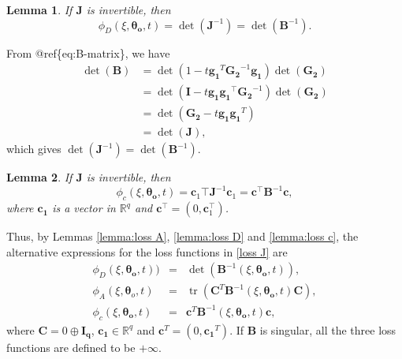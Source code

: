 \documentclass[
]{book}
\newtheorem{lemma}{Lemma}[chapter]
\theoremstyle{definition}
\theoremstyle{definition}
\theoremstyle{definition}
\theoremstyle{definition}
\theoremstyle{remark}
\begin{document}
\begin{lemma}
\protect\hypertarget{lem:loss-D}{}\label{lem:loss-D}If \(\boldsymbol{J}\) is invertible, then
\begin{equation*}
    \phi_D(\xi,\boldsymbol{\theta_o},t)=\det(\boldsymbol{J}^{-1})=\det(\boldsymbol{B}^{-1}).
\end{equation*}
\end{lemma}

From @ref\{eq:B-matrix\}, we have
\begin{align*}
    \det(\boldsymbol{B})    &= \det(1-t\boldsymbol{g_1}^T\boldsymbol{G_2}^{-1}\boldsymbol{g_1})\det(\boldsymbol{G_2})\\
            &= \det(\boldsymbol{I}-t\boldsymbol{g_1}\boldsymbol{g_1}^\top\boldsymbol{G_2}^{-1}) \det(\boldsymbol{G_2}) \\
            &=  \det(\boldsymbol{G_2}-t\boldsymbol{g_1}\boldsymbol{g_1}^T)\\
            &= \det(\boldsymbol{J}),
    \end{align*}
which gives \(\det(\boldsymbol{J}^{-1})=\det(\boldsymbol{B}^{-1})\).

\begin{lemma}
\protect\hypertarget{lem:loss-c}{}\label{lem:loss-c}If \(\boldsymbol{J}\) is invertible, then
\begin{equation*}
    \phi_c(\xi,\boldsymbol{\theta_o},t)=\boldsymbol{c}_1\top\boldsymbol{J}^{-1}\boldsymbol{c}_1=\boldsymbol{c}^\top\boldsymbol{B}^{-1}\boldsymbol{c},
\end{equation*}
where \(\boldsymbol{c_1}\) is a vector in \(\mathbb{R}^q\) and \(\boldsymbol{c}^\top=(0,\boldsymbol{c}_1^\top)\).
\end{lemma}

Thus, by Lemmas \ref{lemma:loss A}, \ref{lemma:loss D} and \ref{lemma:loss c}, the alternative expressions for the loss functions in \eqref{loss J} are
\begin{equation} \label{loss B}
\begin{aligned}
    \phi_D(\xi,\boldsymbol{\theta_o},t))&=&\det(\boldsymbol{B}^{-1}(\xi,\boldsymbol{\theta_o},t)),\\
    \phi_A(\xi,\boldsymbol{\theta}_o,t)&=&\operatorname{tr}(\boldsymbol{C}^T\boldsymbol{B}^{-1}(\xi,\boldsymbol{\theta_o},t)\boldsymbol{C}),\\
    \phi_c(\xi,\boldsymbol{\theta_o},t)&=&\boldsymbol{c}^T\boldsymbol{B}^{-1}(\xi,\boldsymbol{\theta_o},t)\boldsymbol{c},
\end{aligned}
\end{equation}
where \(\boldsymbol{C}= 0 \oplus \boldsymbol{I_q}\), \(\boldsymbol{c_1}\in \mathbb{R}^q\) and \(\boldsymbol{c}^T=(0,\boldsymbol{c_1}^T)\). If \(\boldsymbol{B}\) is singular, all the three loss functions are defined to be \(+\infty\).
\end{document}
